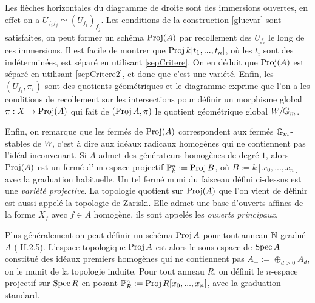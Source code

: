 Les flèches horizontales du diagramme de droite sont des immersions ouvertes, en effet on a $U_{f_if_j}\simeq (U_{f_i})_{f_j}$. Les conditions de la construction \ref{gluevar} sont satisfaites, on peut former un schéma $\operatorname{Proj}(A)$ par recollement des $U_{f_i}$ le long de ces immersions. Il est facile de montrer que $\operatorname{Proj} k[t_1,...,t_n]$, où les $t_i$ sont des indéterminées, est séparé en utilisant \ref{sepCritere}. On en déduit que $\operatorname{Proj}(A)$ est séparé en utilisant \ref{sepCritere2}, et donc que c'est une variété. Enfin, les $(U_{f_i},\pi_i)$ sont des quotients géométriques et le diagramme exprime que l'on a les conditions de recollement sur les intersections pour définir un morphisme global $\pi:X\rightarrow\operatorname{Proj}(A)$ qui fait de $(\operatorname{Proj} A,\pi)$ le quotient géométrique global $W/\mathbb{G}_m$. 

Enfin, on remarque que les fermés de $\operatorname{Proj}(A)$ correspondent aux fermés $\mathbb{G}_m$-stables de $W$, c'est à dire aux idéaux radicaux homogènes qui ne contiennent pas l'idéal inconvenant. Si $A$ admet des générateurs homogènes de degré $1$, alors $\operatorname{Proj}(A)$ est un fermé d'un espace projectif $\mathbb{P}^n_k:=\operatorname{Proj} B$, où $B:=k[x_0,...,x_n]$ avec la graduation habituelle. Un tel fermé muni du faisceau défini ci-dessus  est une \textit{variété projective}. La topologie quotient sur $\operatorname{Proj}(A)$ que l'on vient de définir est aussi appelé la topologie de Zariski. Elle admet une base d'ouverts affines de la forme $X_f$ avec $f\in A$ homogène, ils sont appelés les \textit{ouverts principaux}.


\begin{rem}
Plus généralement on peut définir un schéma $\operatorname{Proj} A$ pour tout anneau $\mathbb{N}$-gradué $A$ (\cite{Hartshorne} II.2.5). L'espace topologique $\operatorname{Proj} A$ est alors le sous-espace de $\operatorname{Spec} A$ constitué des idéaux premiers homogènes qui ne contiennent pas $A_+:=\oplus_{d>0}A_d$, on le munit de la topologie induite. Pour tout anneau $R$, on définit le $n$-espace projectif sur $\operatorname{Spec} R$ en posant $\mathbb{P}^n_R:=\operatorname{Proj} R[x_0,...,x_n]$, avec la graduation standard.
\end{rem}
